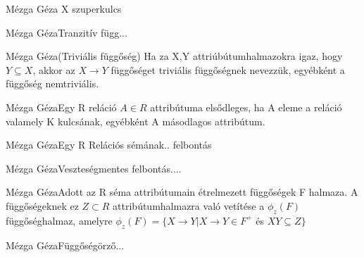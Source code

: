 \begin{definicio}{Mézga Géza}
X szuperkulcs
\end{definicio}\begin{definicio}{Mézga Géza}Tranzitív függ...
\end{definicio}\begin{definicio}{Mézga Géza}(Triviális függőség) Ha za X,Y attriúbútumhalmazokra igaz, hogy $Y \subseteq X$, akkor az $X \rightarrow Y$ függőséget triviális függőségnek nevezzük, egyébként a függőség nemtriviális.
\end{definicio}\begin{definicio}{Mézga Géza}Egy R reláció $A \in R$ attribútuma elsődleges, ha A eleme a reláció valamely K kulcsának, egyébként A másodlagos attribútum.
\end{definicio}\begin{definicio}{Mézga Géza}Egy R Relációs sémának.. felbontás
\end{definicio}\begin{definicio}{Mézga Géza}Veszteségmentes felbontás....
\end{definicio}\begin{definicio}{Mézga Géza}Adott az R séma attribútumain étrelmezett függőségek F halmaza. A függőségeknek ez $Z \subset R$ attribútumhalmazra való vetítése a $\phi_z(F)$ függőséghalmaz, amelyre $\phi_z(F) = \lbrace X\rightarrow Y | X\rightarrow Y \in F^+$ és $XY \subseteq Z \rbrace$
\end{definicio}\begin{definicio}{Mézga Géza}Függőségörző...
\end{definicio}
